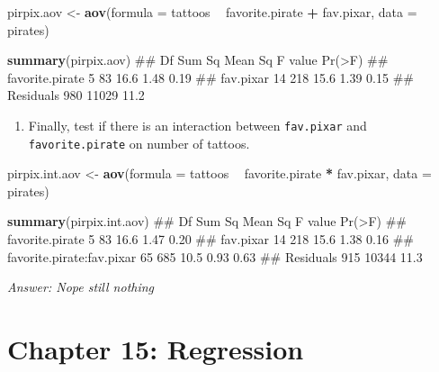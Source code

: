 \documentclass[]{book}
\newenvironment{Shaded}{\begin{snugshade}}{\end{snugshade}}
\newcommand{\KeywordTok}[1]{\textcolor[rgb]{0.13,0.29,0.53}{\textbf{#1}}}
\newcommand{\DataTypeTok}[1]{\textcolor[rgb]{0.13,0.29,0.53}{#1}}
\newcommand{\StringTok}[1]{\textcolor[rgb]{0.31,0.60,0.02}{#1}}
\newcommand{\OperatorTok}[1]{\textcolor[rgb]{0.81,0.36,0.00}{\textbf{#1}}}
\newcommand{\NormalTok}[1]{#1}
\providecommand{\tightlist}{%
  \setlength{\itemsep}{0pt}\setlength{\parskip}{0pt}}
\theoremstyle{definition}
\theoremstyle{definition}
\theoremstyle{remark}
\begin{document}
\begin{Shaded}
\begin{Highlighting}[]
\NormalTok{pirpix.aov <-}\StringTok{ }\KeywordTok{aov}\NormalTok{(}\DataTypeTok{formula =}\NormalTok{ tattoos }\OperatorTok{~}\StringTok{ }\NormalTok{favorite.pirate }\OperatorTok{+}\StringTok{ }\NormalTok{fav.pixar,}
                  \DataTypeTok{data =}\NormalTok{ pirates)}

\KeywordTok{summary}\NormalTok{(pirpix.aov)}
\NormalTok{##                  Df Sum Sq Mean Sq F value Pr(>F)}
\NormalTok{## favorite.pirate   5     83    16.6    1.48   0.19}
\NormalTok{## fav.pixar        14    218    15.6    1.39   0.15}
\NormalTok{## Residuals       980  11029    11.2}
\end{Highlighting}
\end{Shaded}

\begin{enumerate}
\def\labelenumi{\arabic{enumi}.}
\setcounter{enumi}{3}
\tightlist
\item
  Finally, test if there is an interaction between \texttt{fav.pixar}
  and \texttt{favorite.pirate} on number of tattoos.
\end{enumerate}

\begin{Shaded}
\begin{Highlighting}[]
\NormalTok{pirpix.int.aov <-}\StringTok{ }\KeywordTok{aov}\NormalTok{(}\DataTypeTok{formula =}\NormalTok{ tattoos }\OperatorTok{~}\StringTok{ }\NormalTok{favorite.pirate }\OperatorTok{*}\StringTok{ }\NormalTok{fav.pixar,}
                      \DataTypeTok{data =}\NormalTok{ pirates)}

\KeywordTok{summary}\NormalTok{(pirpix.int.aov)}
\NormalTok{##                            Df Sum Sq Mean Sq F value Pr(>F)}
\NormalTok{## favorite.pirate             5     83    16.6    1.47   0.20}
\NormalTok{## fav.pixar                  14    218    15.6    1.38   0.16}
\NormalTok{## favorite.pirate:fav.pixar  65    685    10.5    0.93   0.63}
\NormalTok{## Residuals                 915  10344    11.3}
\end{Highlighting}
\end{Shaded}

\emph{Answer: Nope still nothing}

\section{Chapter 15: Regression}\label{chapter-15-regression}
\end{document}

